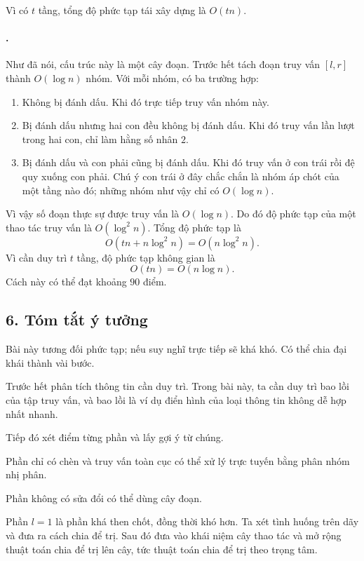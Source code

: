 \documentclass[11pt]{article}
\begin{document}
Vì có \(t\) tầng, tổng độ phức tạp tái xây dựng là \(O(tn)\).

\paragraph{.}
Như đã nói, cấu trúc này là một cây đoạn. Trước hết tách đoạn truy vấn
\([l,r]\) thành \(O(\log n)\) nhóm. Với mỗi nhóm, có ba trường hợp:
\begin{enumerate}
  \item Không bị đánh dấu. Khi đó trực tiếp truy vấn nhóm này.
  \item Bị đánh dấu nhưng hai con đều không bị đánh dấu. Khi đó truy vấn lần
  lượt trong hai con, chỉ làm hằng số nhân \(2\).
  \item Bị đánh dấu và con phải cũng bị đánh dấu. Khi đó truy vấn ở con trái
  rồi đệ quy xuống con phải. Chú ý con trái ở đây chắc chắn là nhóm áp chót
  của một tầng nào đó; những nhóm như vậy chỉ có \(O(\log n)\).
\end{enumerate}

Vì vậy số đoạn thực sự được truy vấn là \(O(\log n)\). Do đó độ phức tạp của
một thao tác truy vấn là \(O(\log^2 n)\). Tổng độ phức tạp là
\[
  O(tn+n\log^2 n)=O(n\log^2 n).
\]
Vì cần duy trì \(t\) tầng, độ phức tạp không gian là
\[
  O(tn)=O(n\log n).
\]
Cách này có thể đạt khoảng \(90\) điểm.

\subsection*{6. Tóm tắt ý tưởng}

Bài này tương đối phức tạp; nếu suy nghĩ trực tiếp sẽ khá khó. Có thể chia đại
khái thành vài bước.

Trước hết phân tích thông tin cần duy trì. Trong bài này, ta cần duy trì bao
lồi của tập truy vấn, và bao lồi là ví dụ điển hình của loại thông tin không
dễ hợp nhất nhanh.

Tiếp đó xét điểm từng phần và lấy gợi ý từ chúng.

Phần chỉ có chèn và truy vấn toàn cục có thể xử lý trực tuyến bằng phân nhóm
nhị phân.

Phần không có sửa đổi có thể dùng cây đoạn.

Phần \(l=1\) là phần khá then chốt, đồng thời khó hơn. Ta xét tình huống trên
dãy và đưa ra cách chia để trị. Sau đó đưa vào khái niệm cây thao tác và mở
rộng thuật toán chia để trị lên cây, tức thuật toán chia để trị theo trọng
tâm.
\end{document}
